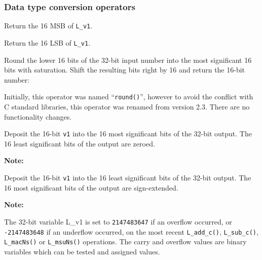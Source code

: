 \subsubsection{Data type conversion operators}


Return the 16 MSB of {\tt L\_v1}.


Return the 16 LSB of {\tt L\_v1}.


Round the lower 16 bits of the 32-bit input number into the most
significant 16 bits with saturation. Shift the resulting bits
right by 16 and return the 16-bit number:


Initially, this operator was named ``{\tt round()}'', however to avoid
the conflict with C standard libraries, this operator was renamed from
version 2.3. There are no functionality changes.


Deposit the 16-bit {\tt v1} into the 16 most significant bits
of the 32-bit output. The 16 least significant bits of the output
are zeroed.

\textbf{Note:} \hfill {}


Deposit the 16-bit {\tt v1} into the 16 least significant bits
of the 32-bit output. The 16 most significant bits of the output
are sign-extended.

\textbf{Note:} \hfill {}



The 32-bit variable L\_v1 is set to {\tt 2147483647} if an overflow
occurred, or {\tt -2147483648} if an underflow occurred, on the
most recent {\tt L\_add\_c()}, {\tt L\_sub\_c()}, {\tt L\_macNs()}
or {\tt L\_msuNs()} operations. The carry and overflow values are
binary variables which can be tested and assigned values.

